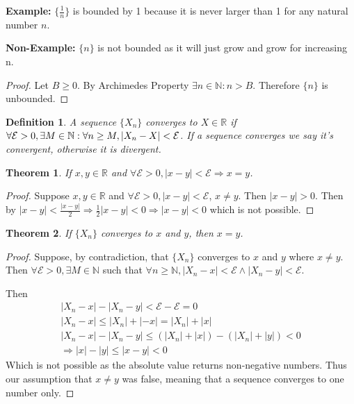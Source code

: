\documentclass[12pt]{article}
\newtheorem{theorem}{Theorem}
\newtheorem{definition}{Definition}
\begin{document}
\noindent 
\textbf{Example:} \(\{\frac{1}{n}\}\) is bounded by 1 because it is never larger than 1 
for any natural number \(n\).

\noindent 
\textbf{Non-Example: } \(\{n\}\) is not bounded as it will just grow and grow 
for increasing n.
\begin{proof}
    Let \(B \geq 0\). By Archimedes Property \(\exists n \in \mathbb N : n > B\). 
    Therefore \(\{n\}\) is unbounded.
\end{proof}
\begin{definition}
    A sequence \(\{X_n\}\) converges to \(X \in \mathbb R\) if 
    \(\forall \mathcal E > 0, \exists M \in \mathbb N : 
    \forall n \geq M, \\ |X_n - X| < \mathcal E \).
    If a sequence converges we say it's convergent, otherwise it is divergent.
\end{definition}
\begin{theorem}
    If \(x,y \in \mathbb R\) and \(\forall \mathcal E > 0, |x-y| < \mathcal E \Rightarrow
    x = y\).
\end{theorem}
\begin{proof}
    Suppose \(x,y \in \mathbb R\) and \(\forall \mathcal E > 0, |x-y| < \mathcal E\), 
    \(x \neq y\). Then \(|x-y| > 0\). Then by \(|x-y| < \frac{|x-y|}{2} \Rightarrow 
    \frac{1}{2}|x-y| < 0 \Rightarrow |x-y| < 0\) which is not possible.
\end{proof}

\begin{theorem}
    If \(\{X_n\}\) converges to \(x\) and \(y\), then \(x = y\).
\end{theorem}
\begin{proof}
    Suppose, by contradiction, that \(\{X_n\}\) converges to \(x\) and \(y\) 
    where \(x \neq y\). 
    Then \(\forall \mathcal E > 0, \exists M \in \mathbb N\) such that 
    \(\forall n \geq \mathbb N, |X_n - x| < \mathcal E \land |X_n - y| < \mathcal E\). 
    
    \noindent 
    Then 
    \begin{gather*}
        |X_n-x| - |X_n - y| < \mathcal E - \mathcal E = 0\\ 
        |X_n-x| \leq |X_n| + |-x| = |X_n| + |x| \\ 
        |X_n-x| - |X_n - y| \leq (|X_n| + |x|) - (|X_n| + |y|) < 0\\
        \Rightarrow |x| - |y| \leq |x - y| < 0 
    \end{gather*}
    Which is not possible as the absolute value returns non-negative numbers. 
    Thus our assumption that \(x \neq y\) was false, meaning that a sequence converges 
    to one number only.
        
    
\end{proof}
\end{document}
